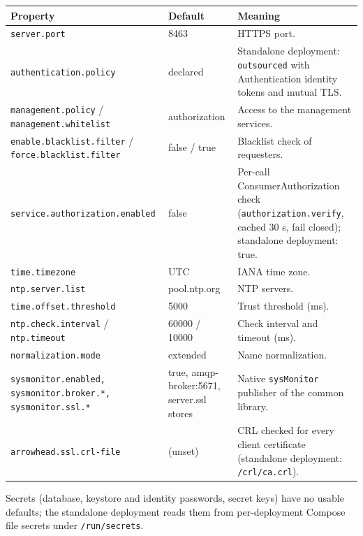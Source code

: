 \documentclass[a4paper]{arrowhead}
\begin{document}
\noindent\begin{longtable}{| p{5.4cm} | p{3.4cm} | p{6.4cm} |} \hline
\rowcolor{gray!33} Property & Default & Meaning \\ \hline \endhead
\texttt{server.\allowbreak{}port} & 8463 & HTTPS port. \\ \hline
\texttt{authentication.\allowbreak{}policy} & declared & Standalone deployment: \texttt{outsourced} with Authentication identity tokens and mutual TLS. \\ \hline
\texttt{management.\allowbreak{}policy} / \texttt{management.\allowbreak{}whitelist} & authorization & Access to the management services. \\ \hline
\texttt{enable.\allowbreak{}blacklist.\allowbreak{}filter} / \texttt{force.\allowbreak{}blacklist.\allowbreak{}filter} & false / true & Blacklist check of requesters. \\ \hline
\texttt{service.\allowbreak{}authorization.\allowbreak{}enabled} & false & Per-call Consumer\allowbreak{}Authorization check (\texttt{authorization.\allowbreak{}verify}, cached 30 s, fail closed); standalone deployment: true. \\ \hline
\texttt{time.\allowbreak{}timezone} & UTC & IANA time zone. \\ \hline
\texttt{ntp.\allowbreak{}server.\allowbreak{}list} & pool.ntp.org & NTP servers. \\ \hline
\texttt{time.\allowbreak{}offset.\allowbreak{}threshold} & 5000 & Trust threshold (ms). \\ \hline
\texttt{ntp.\allowbreak{}check.\allowbreak{}interval} / \texttt{ntp.\allowbreak{}timeout} & 60000 / 10000 & Check interval and timeout (ms). \\ \hline
\texttt{normalization.\allowbreak{}mode} & extended & Name normalization. \\ \hline
\texttt{sysmonitor.\allowbreak{}enabled,\allowbreak{} sysmonitor.\allowbreak{}broker.\allowbreak{}*,\allowbreak{} sysmonitor.\allowbreak{}ssl.\allowbreak{}*} & true, amqp-broker:5671, server.ssl stores & Native \texttt{sysMonitor} publisher of the common library. \\ \hline
\texttt{arrowhead.\allowbreak{}ssl.\allowbreak{}crl-\allowbreak{}file} & (unset) & CRL checked for every client certificate (standalone deployment: \texttt{/\allowbreak{}crl/\allowbreak{}ca.\allowbreak{}crl}). \\ \hline
\end{longtable}

Secrets (database, keystore and identity passwords, secret keys) have no usable defaults; the standalone deployment reads them from per-deployment Compose file secrets under \texttt{/\allowbreak{}run/\allowbreak{}secrets}.
\end{document}
